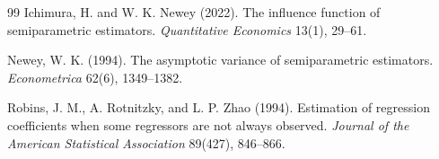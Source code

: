 \documentclass[11pt]{article}
\theoremstyle{definition}
\theoremstyle{plain}
\theoremstyle{remark}
\begin{document}
\begin{thebibliography}{99}
Ichimura, H. and W. K. Newey (2022).
\newblock The influence function of semiparametric estimators.
\newblock \emph{Quantitative Economics} 13(1), 29--61.

Newey, W. K. (1994).
\newblock The asymptotic variance of semiparametric estimators.
\newblock \emph{Econometrica} 62(6), 1349--1382.

Robins, J. M., A. Rotnitzky, and L. P. Zhao (1994).
\newblock Estimation of regression coefficients when some regressors are not
always observed.
\newblock \emph{Journal of the American Statistical Association} 89(427),
846--866.
\end{thebibliography}
\end{document}
